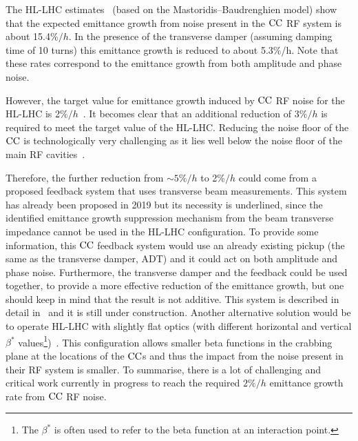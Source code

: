 The HL-LHC estimates~\cite{cc_noise_hl_lhc_estimates} (based on the Mastoridis--Baudrenghien model) show that the expected emittance growth from noise present in the ${\mathrm{CC}}$ RF system is about 15.4$\%/h$. In the presence of the transverse damper (assuming damping time of 10 turns) this emittance growth is reduced to about 5.3$\%$/h. Note that these rates correspond to the emittance growth from both amplitude and phase noise. 


However, the target value for emittance growth induced by ${\mathrm{CC}}$ RF noise for the HL-LHC is 2$\%/h$~\cite{MedinaMedrano:2301928, CC_lumi_limits_philippe, CC_lumi_limits_ilias}. It becomes clear that an additional reduction of 3$\%/h$ is required to meet the target value of the HL-LHC. Reducing the noise floor of the ${\mathrm{CC}}$ is technologically very challenging as it lies well below the noise floor of the main RF cavities~\cite{cc_noise_hl_lhc_estimates}. %


Therefore, the further reduction from $\sim 5\%/h$ to 2$\%/h$ could come from a proposed feedback system that uses transverse beam measurements. This system has already been proposed in 2019 but its necessity is underlined, since the identified emittance growth suppression mechanism from the beam transverse impedance cannot be used in the HL-LHC configuration. To provide some information, this ${\mathrm{CC}}$ feedback system would use an already existing pickup (the same as the transverse damper, ADT) and it could act on both amplitude and phase noise.  Furthermore, the transverse damper and the feedback could be used together, to provide a more effective reduction of the emittance growth, but one should keep in mind that the result is not additive. This system is described in detail in~\cite{Baudrenghien:2665950} and it is still under construction. %
Another alternative solution would be to operate HL-LHC with slightly flat optics (with different horizontal and vertical $\beta^{\ast}$ values\footnote{The $\beta^{\ast}$ is often used to refer to the beta function at an interaction point.})~\cite{elias_run4_op}. %
This configuration allows smaller beta functions in the crabbing plane at the locations of the ${\mathrm{CC}}$s and thus the impact from the noise present in their RF system is smaller. To summarise, there is a lot of challenging and critical work currently in progress to reach the required $2\%/h$ emittance growth rate from ${\mathrm{CC}}$ RF noise.

